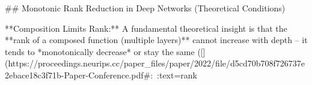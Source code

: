 ## Monotonic Rank Reduction in Deep Networks (Theoretical Conditions)

**Composition Limits Rank:** A fundamental theoretical insight is that the **rank of a composed function (multiple layers)** cannot increase with depth – it tends to *monotonically decrease* or stay the same ([](https://proceedings.neurips.cc/paper_files/paper/2022/file/d5cd70b708f726737e2ebace18c3f71b-Paper-Conference.pdf#:~:text=rank%


